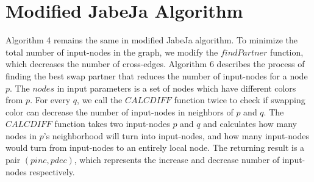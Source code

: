 \section{Modified JabeJa Algorithm}
Algorithm 4 remains the same in modified JabeJa algorithm. To minimize the total number of input-nodes in the graph, we  modify the $findPartner$ function, which decreases the number of cross-edges. Algorithm 6 describes the process of finding the best swap partner that reduces the number of input-nodes for a node $p$. The $nodes$ in input parameters is a set of nodes which have different colors from $p$. For every $q$, we call the $CALCDIFF$ function twice to check if swapping color can decrease the number of input-nodes in neighbors of $p$ and $q$. The $CALCDIFF$ function takes two input-nodes $p$ and $q$ and calculates how many nodes in $p$'s neighborhood will turn into input-nodes, and how many input-nodes would turn from input-nodes to an entirely local node. The returning result is a pair $(pinc, pdec)$, which represents the increase and decrease number of input-nodes respectively.
